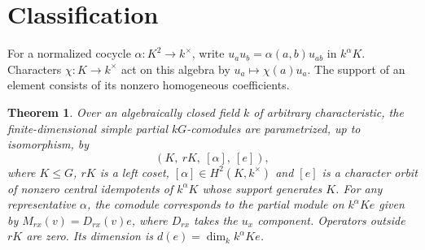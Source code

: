 \documentclass[11pt]{amsart}
\newtheorem{theorem}{Theorem}
\theoremstyle{definition}
\begin{document}
\section{Classification}
For a normalized cocycle $\alpha:K^2\to k^\times$, write $u_au_b=\alpha(a,b)u_{ab}$ in $k^\alpha K$. Characters $\chi:K\to k^\times$ act on this algebra by $u_a\mapsto\chi(a)u_a$. The support of an element consists of its nonzero homogeneous coefficients.

\renewcommand{\thetheorem}{A}
\begin{theorem}\label{thmA}
Over an algebraically closed field $k$ of arbitrary characteristic, the finite-dimensional simple partial $kG$-comodules are parametrized, up to isomorphism, by
\[
 (K,\ rK,\ [\alpha],\ [e]),
\]
where $K\le G$, $rK$ is a left coset, $[\alpha]\in H^2(K,k^\times)$ and $[e]$ is a character orbit of nonzero central idempotents of $k^\alpha K$ whose support generates $K$. For any representative $\alpha$, the comodule corresponds to the partial module on $k^\alpha K e$ given by $M_{rx}(v)=D_{rx}(v)e$, where $D_{rx}$ takes the $u_x$ component. Operators outside $rK$ are zero. Its dimension is $d(e)=\dim_k k^\alpha K e$.
\end{theorem}
\end{document}
